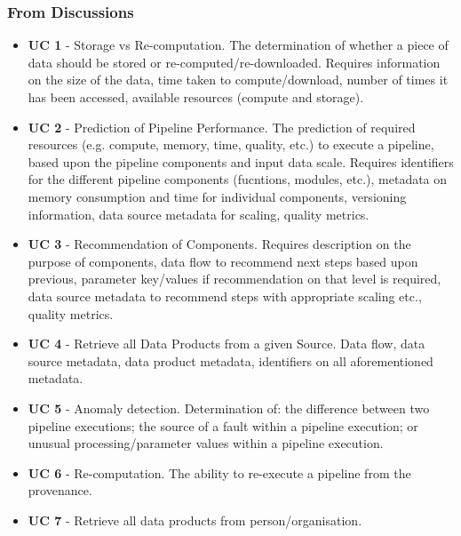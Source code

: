 \subsubsection{From Discussions}
\begin{itemize}[label={}]
    \item {\bf UC 1} - Storage vs Re-computation. The determination of whether a piece of data should be stored or re-computed/re-downloaded. Requires information on the size of the data, time taken to compute/download, number of times it has been accessed, available resources (compute and storage).
    \item {\bf UC 2} - Prediction of Pipeline Performance. The prediction of required resources (e.g. compute, memory, time, quality, etc.) to execute a pipeline, based upon the pipeline components and input data scale. Requires identifiers for the different pipeline components (fucntions, modules, etc.), metadata on memory consumption and time for individual components, versioning information, data source metadata for scaling, quality metrics. 
    \item {\bf UC 3} - Recommendation of Components. Requires description on the purpose of components, data flow to recommend next steps based upon previous, parameter key/values if recommendation on that level is required, data source metadata to recommend steps with appropriate scaling etc., quality metrics.  
    \item {\bf UC 4} - Retrieve all Data Products from a given Source. Data flow, data source metadata, data product metadata, identifiers on all aforementioned metadata. 
    \item {\bf UC 5} - Anomaly detection. Determination of: the difference between two pipeline executions; the source of a fault within a pipeline execution; or unusual processing/parameter values within a pipeline execution.
    \item {\bf UC 6} - Re-computation. The ability to re-execute a pipeline from the provenance.
    \item {\bf UC 7} - Retrieve all data products from person/organisation.
\end{itemize}

